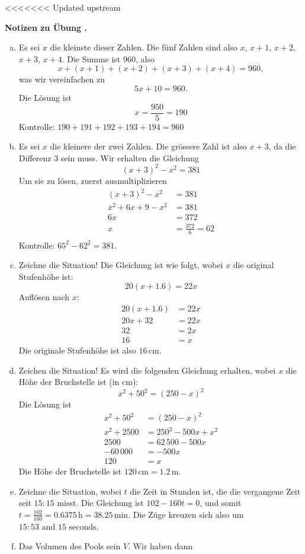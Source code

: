 \documentclass[%
11pt,%
twoside,%
titlepage,%
swissgerman,%
headsepline%
]{scrartcl}
\newcommand{\faReturnGray}{\textcolor{gray}{\faMailReply}} %
\theoremstyle{definition}
\theoremstyle{plain}
\theoremstyle{plain}
\newcommand{\concatueb}[1]{ueb:#1}%
\newcommand{\concatlsg}[1]{lsg:#1}%
\newcounter{uebcounter}[section]
\renewcommand{\theuebcounter}{\thesection.\arabic{uebcounter}}  %
\newenvironment{lsg}[1]{%
<<<<<<< Updated upstream
	\par\noindent\textbf{Notizen zu Übung \theuebcounter\label{\concatlsg{#1}}}
	\hfill\hyperref[\concatueb{#1}]{\faReturnGray}\par %
}{%
	\par%
}
\begin{document}
	\begin{lsg}{saetzchenaufgaben}
		\begin{enumerate}[a)]
			\item Es sei $x$ die kleinste dieser Zahlen. Die fünf Zahlen sind also $x$, $x+1$, $x+2$, $x+3$, $x+4$. Die Summe ist $960$, also
			$$x+(x+1)+(x+2)+(x+3)+(x+4)=960,$$
			was wir vereinfachen zu $${5x+10=960}.$$
			Die Lösung ist $$x=\frac{950}{5}={190}$$ Kontrolle: $190+191+192+193+194=960$
			\item Es sei $x$ die kleinere der zwei Zahlen. Die grössere Zahl ist also $x+3$, da die Differenz $3$ sein muss. Wir erhalten die Gleichung $${(x+3)^2-x^2=381}$$ Um sie zu lösen, zuerst ausmultiplizieren
			\begin{align*}
				(x+3)^2-x^2 & =381 \\
				{x^2}+6x+9 -{x^2} & = 381\tag{$-9$}\\
				6x & = 372\tag{$\div6$}\\
				x & =\frac{372}{6}={62}\\ 
			\end{align*}
			Kontrolle: $65^2-62^2=381$.
			\item Zeichne die Situation!
			Die Gleichung ist wie folgt, wobei $x$ die original Stufenhöhe ist: $${20  (x+1.6) = 22x}$$ Auflösen nach $x$:
			\begin{align*}
				20  (x+1.6) & = 22x \\
				20x+32 & = 22x\tag{$-20x$}\\
				32 & = 2x\tag{$\div2$}\\
				{16} & =x 
			\end{align*}
			Die originale Stufenhöhe ist also $16\,\text{cm}$.
			\item Zeichen die Situation!
			Es wird die folgenden Gleichung erhalten, wobei $x$ die Höhe der Bruchstelle ist (in cm): $${x^2+50^2 = (250-x)^2}$$ Die Lösung ist
			\begin{align*}
				x^2+50^2 & = (250-x)^2 \\
				x^2+2500 & = 250^2-500x+x^2\tag{$-x^2$}\\
				2500 & = 62\,500-500x\tag{$-62\,500$}\\
				-60\,000 & = -500x\tag{$\div(-500)$}\\
					{120} & =x 
				\end{align*}
				Die Höhe der Bruchstelle ist $120\,\text{cm}=1.2\,\text{m}$.
				\item Zeichne die Situation, wobei $t$ die Zeit in Stunden ist, die die vergangene Zeit seit $15:15$ misst.
				Die Gleichung ist ${102-160 t = 0}$, und somit $t=\frac{102}{160}=0.6375\,\text{h} = 38.25 \,\text{min}$. Die Züge kreuzen sich also um ${15:53 \mbox{ and } 15 \mbox{ seconds}}$.
				\item Das Volumen des Pools sein $V$. Wir haben dann
				

\end{enumerate}
\end{lsg}
\end{document}
